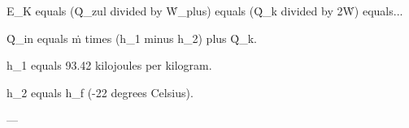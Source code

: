 E_K equals (Q̇_zul divided by Ẇ_plus) equals (Q̇_k divided by 2Ẇ) equals...  

Q̇_in equals ṁ times (h_1 minus h_2) plus Q̇_k.  

h_1 equals 93.42 kilojoules per kilogram.  

h_2 equals h_f (-22 degrees Celsius).  

---